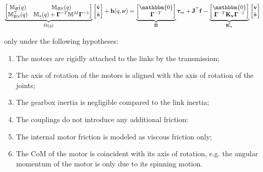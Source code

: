 \begin{equation}
    \underbrace{\begin{bmatrix}
            \mathbb{M} _{\mathcal{B}}(q)        & \mathbb{M} _{\mathcal{B}S}(q)                                                      \\
            \mathbb{M} _{\mathcal{B}S} ^\top(q) & \mathbb{M} _s(q) + \boldsymbol{\Gamma} ^{-T}\mathbb{M} ^M\boldsymbol{\Gamma} ^{-1}
        \end{bmatrix}} _{\bar{\mathbb{M}}(q)}
    \begin{bmatrix}
        \dot{\mathrm{\mathbf{v}}} \\
        \ddot{\mathbf{s}}
    \end{bmatrix}+
    \mathbf{h}
    (q,\boldsymbol{\nu}) =
    \underbrace{\begin{bmatrix}
            \mathbbm{0} \\
            \boldsymbol{\Gamma} ^{-T}
        \end{bmatrix}} _{\mathbf{\bar{B}}}
    \boldsymbol{\tau} _m
    +
    \mathbf{J} ^\top
    \mathbf{f}
    -
    \underbrace{\begin{bmatrix}
            \mathbbm{0} \\
            \boldsymbol{\Gamma} ^{-T}\mathbf{K _v}\boldsymbol{\Gamma} ^{-1}
        \end{bmatrix}} _\mathbf{\bar{K _v}}
    \begin{bmatrix}
        \mathrm{\mathbf{v}} \\
        \dot{\mathbf{s}}
    \end{bmatrix}
\end{equation}

only under the following hypotheses:

\begin{enumerate}
    \item The motors are rigidly attached to the links by the transmission;
    \item The axis of rotation of the motors is aligned with the axis of rotation of the joints;
    \item The gearbox inertia is negligible compared to the link inertia;
    \item The couplings do not introduce any additional friction:
    \item The internal motor friction is modeled as viscous friction only;
    \item The \ac{CoM} of the motor is coincident with its axis of rotation, e.g. the angular momentum of the motor is only due to its spinning motion.
\end{enumerate}

